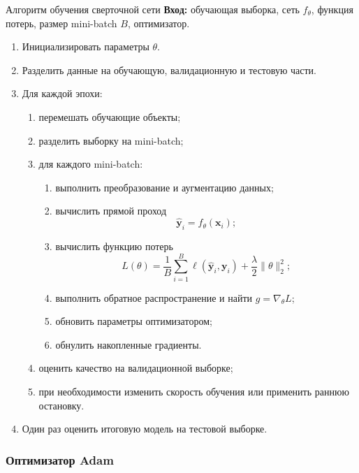 \documentclass[12pt,a4paper]{article}
\numberwithin{equation}{section}
\theoremstyle{definition}
\theoremstyle{remark}
\begin{document}
\begin{algobox}{Алгоритм обучения сверточной сети}
\textbf{Вход:} обучающая выборка, сеть \(f_\theta\), функция потерь,
размер mini-batch \(B\), оптимизатор.

\begin{enumerate}
    \item Инициализировать параметры \(\theta\).

    \item Разделить данные на обучающую, валидационную и тестовую
    части.

    \item Для каждой эпохи:
    \begin{enumerate}
        \item перемешать обучающие объекты;
        \item разделить выборку на mini-batch;
        \item для каждого mini-batch:
        \begin{enumerate}
            \item выполнить преобразование и аугментацию данных;
            \item вычислить прямой проход
            \[
                \widehat{\bm{y}}_i=f_\theta(\bm{x}_i);
            \]
            \item вычислить функцию потерь
            \[
                L(\theta)
                =
                \frac{1}{B}\sum_{i=1}^{B}
                \ell(\widehat{\bm{y}}_i,\bm{y}_i)
                +
                \frac{\lambda}{2}\|\theta\|_2^2;
            \]
            \item выполнить обратное распространение и найти
            \(g=\nabla_\theta L\);
            \item обновить параметры оптимизатором;
            \item обнулить накопленные градиенты.
        \end{enumerate}
        \item оценить качество на валидационной выборке;
        \item при необходимости изменить скорость обучения или
        применить раннюю остановку.
    \end{enumerate}

    \item Один раз оценить итоговую модель на тестовой выборке.
\end{enumerate}
\end{algobox}

\subsubsection{Оптимизатор Adam}
\end{document}
